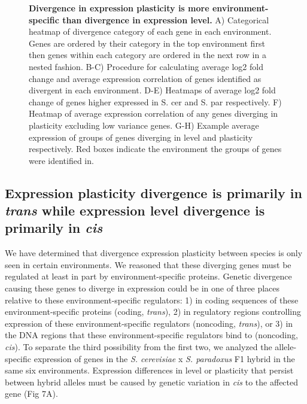 \begin{figure}
    \centering
    \caption{\textbf{Divergence in expression plasticity is more environment-specific than divergence in expression level.} A) Categorical heatmap of divergence category of each gene in each environment. Genes are ordered by their category in the top environment first then genes within each category are ordered in the next row in a nested fashion. B-C) Procedure for calculating average log2 fold change and average expression correlation of genes identified as divergent in each environment. D-E) Heatmaps of average log2 fold change of genes higher expressed in S. cer and S. par respectively. F) Heatmap of average expression correlation of any genes diverging in plasticity excluding low variance genes. G-H) Example average expression of groups of genes diverging in level and plasticity respectively. Red boxes indicate the environment the groups of genes were identified in.}
    \label{fig:patterns}
\end{figure}

\subsection{Expression plasticity divergence is primarily in \textit{trans} while expression level divergence is primarily in \textit{cis}}

We have determined that divergence expression plasticity between species is only seen in certain environments. We reasoned that these diverging genes must be regulated at least in part by environment-specific proteins. Genetic divergence causing these genes to diverge in expression could be in one of three places relative to these environment-specific regulators: 1) in coding sequences of these environment-specific proteins (coding, \textit{trans}), 2) in regulatory regions controlling expression of these environment-specific regulators (noncoding, \textit{trans}), or 3) in the DNA regions that these environment-specific regulators bind to (noncoding, \textit{cis}). To separate the third possibility from the first two, we analyzed the allele-specific expression of genes in the \textit{S. cerevisiae} x \textit{S. paradoxus} F1 hybrid in the same six environments. Expression differences in level or plasticity that persist between hybrid alleles must be caused by genetic variation in \textit{cis} to the affected gene (Fig 7A).

